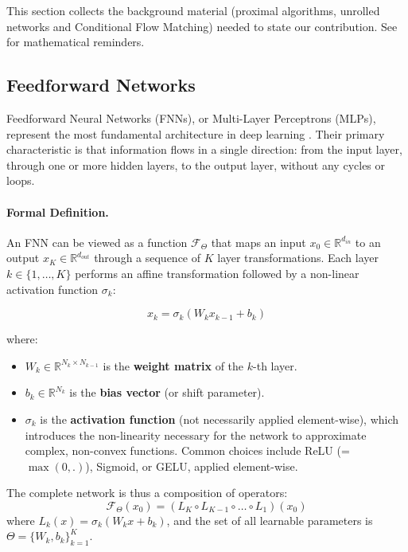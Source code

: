 \documentclass[a4paper,11pt]{article}
\theoremstyle{plain}{\theorembodyfont{\rmfamily}%
\newtheorem{proposition}[theorem]{Proposition}}
\theoremstyle{plain}{\theorembodyfont{\rmfamily}%
\newtheorem{notation}[theorem]{Notation}}
\theoremstyle{plain}{\theorembodyfont{\rmfamily}%
\newtheorem{assumption}[theorem]{Assumption}}
\theoremstyle{plain}{\theorembodyfont{\rmfamily}%
\newtheorem{problem}[theorem]{Problem}}
\theoremstyle{plain}{\theorembodyfont{\rmfamily}%
\newtheorem{example}[theorem]{Example}}
\theoremstyle{plain}{\theorembodyfont{\rmfamily}%
\newtheorem{remark}[theorem]{Remark}}
\theoremstyle{plain}{\theorembodyfont{\rmfamily}%
\newtheorem{definition}[theorem]{Definition}}
\theoremstyle{plain}{\theorembodyfont{\rmfamily}%
\newtheorem{question}[theorem]{Question}}
\numberwithin{equation}{section}
\begin{document}
This section collects the background material (proximal
algorithms, unrolled networks and Conditional Flow Matching) needed to state
our contribution. See  for mathematical reminders.

\subsection{Feedforward Networks}

Feedforward Neural Networks (FNNs), or Multi-Layer Perceptrons (MLPs), represent the most fundamental architecture in deep learning \cite{goodfellow2016deep}. Their primary characteristic is that information flows in a single direction: from the input layer, through one or more hidden layers, to the output layer, without any cycles or loops.

\paragraph{Formal Definition.}
An FNN can be viewed as a function $\mathcal{F}_\Theta$ that maps an input $x_0 \in \mathbb{R}^{d_{in}}$ to an output $x_K \in \mathbb{R}^{d_{out}}$ through a sequence of $K$ layer transformations. Each layer $k \in \{1, \dots, K\}$ performs an affine transformation followed by a non-linear activation function $\sigma_k$:

\begin{equation}
    x_k = \sigma_k(W_k x_{k-1} + b_k)
\end{equation}

where:
\begin{itemize}
    \item $W_k \in \mathbb{R}^{N_k \times N_{k-1}}$ is the \textbf{weight matrix} of the $k$-th layer.
    \item $b_k \in \mathbb{R}^{N_k}$ is the \textbf{bias vector} (or shift parameter).
    \item $\sigma_k$ is the \textbf{activation function} (not necessarily applied element-wise), which introduces the non-linearity necessary for the network to approximate complex, non-convex functions. Common choices include ReLU (= $\max(0,.)$), Sigmoid, or GELU, applied element-wise.
\end{itemize}

The complete network is thus a composition of operators:
\begin{equation}
    \mathcal{F}_\Theta(x_0) = (L_K \circ L_{K-1} \circ \dots \circ L_1)(x_0)
\end{equation}
where $L_k(x) = \sigma_k(W_k x + b_k)$, and the set of all learnable parameters is $\Theta = \{W_k, b_k\}_{k=1}^K$.
\end{document}
